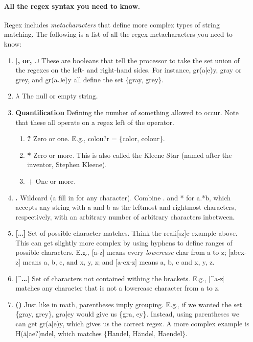 \documentclass[10pt]{article}
\begin{document}
\paragraph{All the regex syntax you need to know.}
Regex includes \textit{metacharacters} that define more complex types
of string matching.
The following is a list of all the regex metacharacters you need to know:

\begin{enumerate}
\item \textbf{|, or, $\cup$}
These are booleans that tell the processor to take the set union of the regexes
on the left- and right-hand sides.
For instance, gr(a|e)y, gray or grey, and gr(a$\cup$e)y all define the set
\{gray, grey\}.

\item \textbf{$\lambda$}
The null or empty string.

\item \textbf{Quantification}
Defining the number of something allowed to occur.
Note that these all operate on a regex left of the operator.
    \begin{enumerate}
    \item \textbf{?}
    Zero or one.
    E.g., colou?r = \{color, colour\}.
    \item \textbf{*}
    Zero or more.
    This is also called the Kleene Star (named after the inventor, Stephen Kleene).
    \item \textbf{+}
    One or more.
    \end{enumerate}

\item \textbf{.}
Wildcard (a fill in for any character).
Combine . and * for a.*b, which accepts any string with a and b as the leftmost and rightmost
characters, respectively, with an arbitrary number of arbitrary characters inbetween.

\item \textbf{[\ldots]}
Set of possible character matches.
Think the reali[sz]e example above.
This can get slightly more complex by using hyphens to define ranges of possible characters.
E.g., [a-z] means every \textit{lowercase} char from a to z;
[abcx-z] means a, b, c, and x, y, z; and [a-cx-z] means a, b, c and x, y, z.

\item \textbf{[\string^\ldots]}
Set of characters not contained withing the brackets.
E.g., [\string^a-z] matches any character that is not a lowercase character from a to z.

\item \textbf{()}
Just like in math, parentheses imply grouping.
E.g., if we wanted the set \{gray, grey\}, gra|ey would give us \{gra, ey\}.
Instead, using parentheses we can get gr(a|e)y, which gives us the correct regex.
A more complex example is H(\"{a}|ae?)ndel, which matches \{Handel, H\"{a}ndel, Haendel\}.
\end{enumerate}
\end{document}
